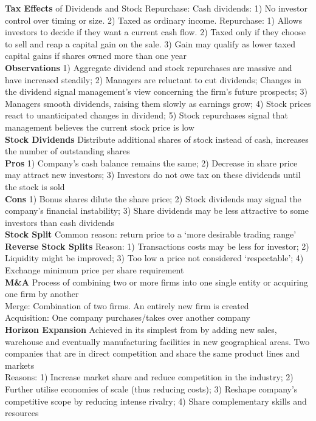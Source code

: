 \documentclass[12pt,landscape, a4paper]{article}
\theoremstyle{remark}
\begin{document}
\begin{multicols*}{3}
\textbf{Tax Effects} of Dividends and Stock Repurchase: Cash dividends: 1) No investor control over timing or size. 2) Taxed as ordinary income. Repurchase: 1) Allows investors to decide if they want a current cash flow. 2) Taxed only if they choose to sell and reap a capital gain on the sale. 3) Gain may qualify as lower taxed capital gains if shares owned more than one year\\

\textbf{Observations} 1) Aggregate dividend and stock repurchases are massive and have increased steadily; 2) Managers are reluctant to cut dividends; Changes in the dividend signal management’s view concerning the firm’s future prospects; 3) Managers smooth dividends, raising them slowly as earnings grow; 4) Stock prices react to unanticipated changes in dividend; 5) Stock repurchases signal that management believes the current stock price is low\\

\textbf{Stock Dividends} Distribute additional shares of stock instead of cash, increases the number of outstanding shares\\
\textbf{Pros} 1) Company's cash balance remains the same; 2) Decrease in share price may attract new investors; 3) Investors do not owe tax on these dividends until the stock is sold\\
\textbf{Cons} 1) Bonus shares dilute the share price; 2) Stock dividends may signal the company's financial instability; 3) Share dividends may be less attractive to some investors than cash dividends\\

\textbf{Stock Split} Common reason: return price to a `more desirable trading range'\\
\textbf{Reverse Stock Splits} Reason: 1) Transactions costs may be less for investor; 2) Liquidity might be improved; 3) Too low a price not considered `respectable'; 4) Exchange minimum price per share requirement\\

\textbf{M\&A} Process of combining two or more firms into one single entity or acquiring one firm by another\\
Merge: Combination of two firms. An entirely new firm is created\\
Acquisition: One company purchases/takes over another company\\

\textbf{Horizon Expansion} Achieved in its simplest from by adding new sales, warehouse and eventually manufacturing facilities in new geographical areas. Two companies that are in direct competition and share the same product lines and markets\\
Reasons: 1) Increase market share and reduce competition in the industry; 2) Further utilise economies of scale (thus reducing costs); 3) Reshape company’s competitive scope by reducing intense rivalry; 4) Share complementary skills and resources\\


\end{multicols*}
\end{document}
